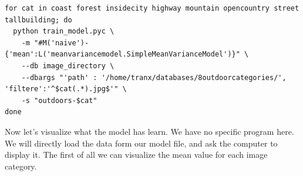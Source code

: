 \documentclass{report}
\begin{document}
\begin{lstlisting}
for cat in coast forest insidecity highway mountain opencountry street tallbuilding; do
  python train_model.pyc \
    -m "#M('naive')-{'mean':L('meanvariancemodel.SimpleMeanVarianceModel')}" \
    --db image_directory \
    --dbargs "'path' : '/home/tranx/databases/8outdoorcategories/', 'filtere':'^$cat(.*).jpg$'" \
    -s "outdoors-$cat" 
done

\end{lstlisting}







Now let's visualize what the model has learn. We have no specific program here.
We will directly load the data form our model file, and ask the computer to display it.
The first of all we can visualize the mean value for each image category.
\end{document}
